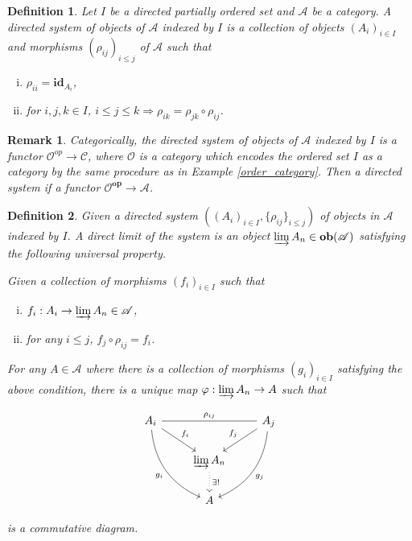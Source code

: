 \documentclass{article}
\newtheorem{definition}{Definition}[section]
\newtheorem{remark}{Remark}[section]
\numberwithin{equation}{section}
\begin{document}
\begin{definition}
Let $I$ be a directed partially ordered set and $\mathcal{A}$ be a category. A directed system of objects of $\mathcal{A}$ indexed by $I$ is a collection of objects $(A_i)_{i\in I}$ and morphisms $(\rho_{ij})_{i\leq j}$ of $\mathcal{A}$ such that 
\begin{enumerate}[i).]
\item $\rho_{ii}=\mathbf{id}_{A_i}$,
\item for $i,j,k\in I$, $i\leq j \leq k \Rightarrow \rho_{ik} = \rho_{jk}\circ\rho_{ij}$.
\end{enumerate}
\end{definition}

\begin{remark}
Categorically, the directed system of objects of $\mathcal{A}$ indexed by $I$ is a functor $\mathcal{O}^{op}\to\mathcal{C}$, where $\mathcal{O}$ is a category which encodes the ordered set $I$ as a category by the same procedure as in Example \ref{order_category}. Then a directed system if a functor $\mathcal{O}^{\mathbf{op}}\to\mathcal{A}$.
\end{remark}

\begin{definition}
Given a directed system $((A_i)_{i\in I},\{\rho_{ij}\}_{i\leq j})$ of objects in $\mathcal{A}$ indexed by $I$. A direct limit of the system is an object $\varinjlim{A_n}\in\mathbf{ob}(\mathcal{A})$ satisfying the following universal property.\\
\par Given a collection of morphisms $(f_i)_{i\in I}$ such that 
\begin{enumerate}[i).]
\item $f_i:A_i\to\varinjlim A_n\in\mathcal{A}$,
\item for any $i\leq j$, $f_j\circ\rho_{ij} = f_i$.
\end{enumerate}
For any $A\in\mathcal{A}$ where there is a collection of morphisms $(g_i)_{i\in I}$ satisfying the above condition, there is a unique map $\varphi:\varinjlim A_n\to A$ such that

\[ 
\begin{tikzcd}
A_i \arrow[rr, "\rho_{ij}", no head] \arrow[rd, "f_i"] \arrow[rdd, swap, "g_i", bend right] &                                               & A_j \arrow[ld, "f_j"'] \arrow[ldd, "g_j", bend left] \\
                                                                                      & \varinjlim A_n \arrow[d, "\exists !", dotted] &                                                      \\
                                                                                      & A                                             &                                                     
\end{tikzcd}
\]

is a commutative diagram.
\end{definition}
\end{document}
